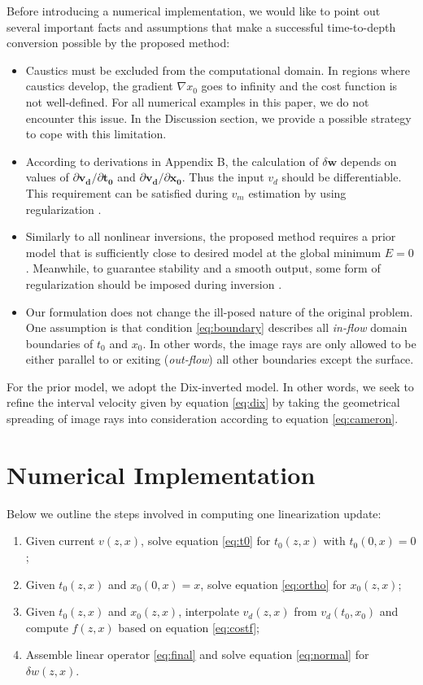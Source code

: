 Before introducing a numerical implementation, we would like to point out several important facts 
and assumptions that make a successful time-to-depth conversion possible by the proposed method:
\begin{itemize}
\item Caustics must be excluded from the computational domain. In regions where caustics develop, the gradient 
$\nabla x_0$ goes to infinity and the cost function is not well-defined. For all numerical examples in this 
paper, we do not encounter this issue. In the Discussion section, we provide a possible strategy to cope with 
this limitation.
\item According to derivations in Appendix B, the calculation of $\delta \mathbf{w}$ depends on 
values of $\partial \mathbf{v_d} / \partial \mathbf{t_0}$ and $\partial \mathbf{v_d} / \partial \mathbf{x_0}$. 
Thus the input $v_d$ should be differentiable. This requirement can be satisfied during $v_m$ estimation by 
using regularization \cite[]{fomel1}.
\item Similarly to all nonlinear inversions, the proposed method requires a 
prior model that is sufficiently close to desired model at the global minimum $E = 0$. Meanwhile, to 
guarantee stability and a smooth output, some form of regularization should be imposed during 
inversion \cite[]{engl,zhdanov}.
\item Our formulation does not change the ill-posed nature of the original problem. One 
assumption is that condition \ref{eq:boundary} describes all \textit{in-flow} domain boundaries of $t_0$ and 
$x_0$. In other words, the image rays are only allowed to be either parallel to or exiting (\textit{out-flow}) 
all other boundaries  except the surface.
\end{itemize}

For the prior model, we adopt the Dix-inverted model. In other words, we seek to refine the interval 
velocity given by equation \ref{eq:dix} by taking the geometrical spreading of image rays into consideration 
according to equation \ref{eq:cameron}.

\section{Numerical Implementation}

Below we outline the steps involved in computing one linearization update:

\begin{enumerate}
\item Given current $v (z,x)$, solve equation \ref{eq:t0} for $t_0 (z,x)$ with $t_0 (0,x) = 0$;
\item Given $t_0 (z,x)$ and $x_0 (0,x) = x$, solve equation \ref{eq:ortho} for $x_0 (z,x)$;
\item Given $t_0 (z,x)$ and $x_0 (z,x)$, interpolate $v_d (z,x)$ from $v_d (t_0,x_0)$ and compute $f (z,x)$ 
based on equation \ref{eq:costf};
\item Assemble linear operator \ref{eq:final} and solve equation \ref{eq:normal} for $\delta w (z,x)$.
\end{enumerate}

